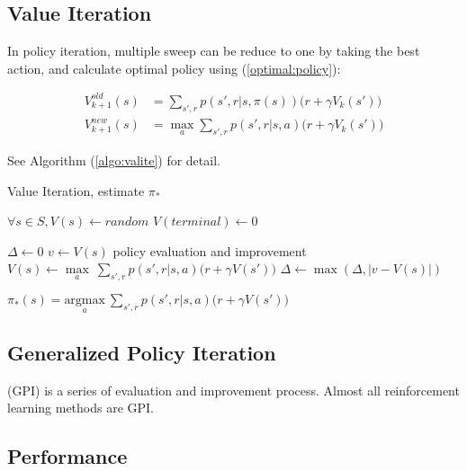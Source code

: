 \subsection{Value Iteration}

In policy iteration, multiple sweep can be reduce to one by taking the best action, and calculate optimal policy using (\ref{optimal:policy}):

\begin{equation}
	\begin{aligned}
		V_{k+1}^{old} (s) &= \sum_{s',r} p(s',r|s,\pi(s))\big (r+\gamma V_k(s') \big ) \\
		V_{k+1}^{new} (s) &= \underset{a}{\max} \sum_{s',r} p(s',r|s,a) \big (r+\gamma V_k(s') \big )
	\end{aligned}
\end{equation}

See Algorithm (\ref{algo:valite}) for detail.

\begin{algorithm}
	\caption{Value Iteration, estimate $\pi_*$}\label{algo:valite}
	
	\begin{algorithmic}[1]
		\State $\forall s \in S, V(s) \gets random$
		\State $V(terminal) \gets 0$
		
		\Statex
		
		\Repeat
			\State $\Delta \gets 0$
				\State $v \gets V(s)$
				\State \Comment policy evaluation and improvement
				\State $V(s) \gets \underset{a}{\max}\ \sum\limits_{s',r} p(s',r|s,a) \big ( r+\gamma V(s') \big )$ 
				\State $\Delta \gets \max (\Delta, |v - V(s)|)$
			\EndFor
		\Until{$\Delta < \theta$}
		
		\State \Return $\pi_*(s)= \underset{a}{\text{argmax}} \ \sum\limits_{s',r} p(s',r|s,a) \big (r+\gamma V(s') \big )$
	\end{algorithmic}
\end{algorithm}

\subsection{Generalized Policy Iteration}

 (GPI) is a series of evaluation and improvement process. Almost all reinforcement learning methods are GPI.


\subsection{Performance}

